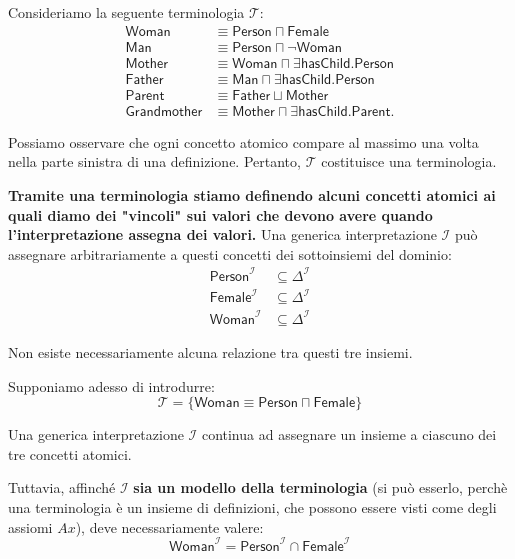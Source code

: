 Consideriamo la seguente terminologia $\mathcal{T}$:
\[
\begin{aligned}
    \mathsf{Woman}
    &\equiv \mathsf{Person} \sqcap \mathsf{Female}\\
    \mathsf{Man}
    &\equiv \mathsf{Person} \sqcap \neg\mathsf{Woman}\\
    \mathsf{Mother}
    &\equiv \mathsf{Woman} \sqcap
    \exists\mathsf{hasChild}.\mathsf{Person}\\
    \mathsf{Father}
    &\equiv \mathsf{Man} \sqcap
    \exists\mathsf{hasChild}.\mathsf{Person}\\
    \mathsf{Parent}
    &\equiv \mathsf{Father} \sqcup \mathsf{Mother}\\
    \mathsf{Grandmother}
    &\equiv \mathsf{Mother} \sqcap
    \exists\mathsf{hasChild}.\mathsf{Parent}.
\end{aligned}
\]

Possiamo osservare che ogni concetto atomico compare al
massimo una volta nella parte sinistra di una definizione.
Pertanto, $\mathcal{T}$ costituisce una terminologia.

\textbf{Tramite una terminologia stiamo definendo alcuni concetti atomici ai quali diamo dei "vincoli" sui valori che devono avere quando l'interpretazione assegna dei valori.}
Una generica interpretazione \(\mathcal I\) può assegnare arbitrariamente a questi concetti dei sottoinsiemi del dominio:
\[
\begin{aligned}
\mathsf{Person}^{\mathcal I}&\subseteq\Delta^{\mathcal I}\\
\mathsf{Female}^{\mathcal I}&\subseteq\Delta^{\mathcal I}\\
\mathsf{Woman}^{\mathcal I}&\subseteq\Delta^{\mathcal I}
\end{aligned}
\]

Non esiste necessariamente alcuna relazione tra questi tre insiemi.

Supponiamo adesso di introdurre:
\[
\mathcal T=\{\mathsf{Woman}\equiv
\mathsf{Person}\sqcap\mathsf{Female}\}
\]

Una generica interpretazione \(\mathcal I\) continua ad assegnare un insieme a ciascuno dei tre concetti atomici.

Tuttavia, affinché \(\mathcal I\) \textbf{sia un modello della terminologia} (si può esserlo, perchè una terminologia è un insieme di definizioni, che possono essere visti come degli assiomi $Ax$), deve necessariamente valere:
\[
\mathsf{Woman}^{\mathcal I}=
\mathsf{Person}^{\mathcal I}\cap
\mathsf{Female}^{\mathcal I}
\]

